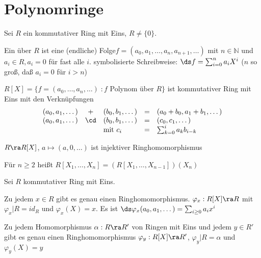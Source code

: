 \section{Polynomringe}

\begin{DefBem}
Sei $R$ ein kommutativer Ring
mit Eins, $R \neq \{0\}$.
\begin{enum}
\item Ein  über $R$ ist eine (endliche) Folge\medskip\newline $f=(a_0,
a_1,\dots, a_n,a_{n+1},\dots)$ mit $n \in \mathbb{N}$ und $a_i \in
R, a_i = 0$ für fast alle $i$.
\newline symbolisierte Schreibweise: $\ds f=\sum_{i=0}^n a_i X^i$
\newline($n$ so groß, daß $a_i = 0$ für $i > n$)
\item $R[X] = \{f = (a_0,\dots,a_n,\dots)\;: f$ Polynom über $R\}$
ist kommutativer Ring mit Eins mit den Verknüpfungen
\[\begin{array}{lclcl}
(a_0,a_1,\dots)& + &(b_0,b_1,\dots)& = &(a_0+b_0,a_1+b_1,\dots) \\
(a_0,a_1,\dots)& \cd &(b_0, b_1,\dots)& = &(c_0, c_1,\dots) \\
&&\mbox{mit } c_i & =& \sum_{k=0}^i a_k b_{i-k}\end{array}\]
\item $R \ra R[X]$, $a \mapsto (a,0,\dots)$ ist injektiver
Ringhomomorphismus
\item Für $n \geq 2$ heißt $R[X_1,\dots,X_n] =
(R[X_1,\dots,X_{n-1}])(X_n)$ \newline{}
\end{enum}
\end{DefBem}

\begin{Prop}
Sei $R$ kommutativer Ring mit Eins.
\begin{enum}
\item Zu jedem $x \in R$ gibt es genau einen Ringhomomorphismus.
$\varphi_x: R[X] \ra R$ mit $\varphi_x|R = id_R$ und $\varphi_x(X) =
x$. Es ist $\ds \varphi_x(a_0, a_1, \dots) = \sum_{i\geq 0} a_i x^i$
\item Zu jedem Homomorphismus $\alpha: R \ra R'$ von Ringen mit Eins
und jedem $y \in R'$ gibt es genau einen Ringhomomorphismus
$\varphi_y:R[X]\ra R'$, $\varphi_y|R = \alpha$ und $\varphi_y(X) =
y$
\end{enum}
\end{Prop}

